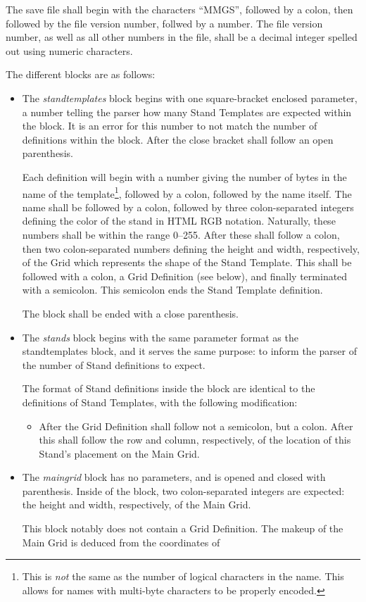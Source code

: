 \documentclass{report}
\begin{document}
The save file shall begin with the characters ``MMGS'', followed by a colon,
then followed by the file version number, follwed by a number. The
file version number, as well as all other numbers in the file, shall be a
decimal integer spelled out using numeric characters.

The different blocks are as follows:
\begin{itemize}
	\item The \emph{standtemplates} block begins with one square-bracket
		enclosed parameter, a number telling the parser how many
		Stand Templates are expected within the block. It is an error
		for this number to not match the number of definitions within
		the block. After the close bracket shall follow an open
		parenthesis.

		Each definition will begin with a number giving the number of
		bytes in the name of the template\footnote{This is \emph{not}
			the same as the number of logical characters in the
			name. This allows for names with multi-byte characters
		to be properly encoded.}, followed by a colon,
		followed by the name itself. The name shall be followed by
		a colon, followed by three colon-separated integers 
		defining the color of the stand in HTML RGB notation.
		Naturally, these numbers shall be within the range 0--255.
		After these shall follow a colon, then two colon-separated
		numbers defining the height and width, respectively, of
		the Grid which represents the shape of the Stand Template. This
		shall be followed with a colon, a Grid Definition (see below),
		and finally terminated with a semicolon. This semicolon ends
		the Stand Template definition.

		The block shall be ended with a close parenthesis.
	\item The \emph{stands} block begins with the same parameter format as
		the standtemplates block, and it serves the same purpose:
		to inform the parser of the number of Stand definitions to
		expect.

		The format of Stand definitions inside the block are
		identical to the definitions of Stand Templates, with the
		following modification:
		\begin{itemize}
			\item After the Grid Definition shall follow not a
				semicolon, but a colon. After this shall
				follow the row and column, respectively, of
				the location of this Stand's placement
				on the Main Grid.
		\end{itemize}
	\item The \emph{maingrid} block has no parameters, and is opened
		and closed with parenthesis. Inside of the
		block, two colon-separated integers are expected: the
		height and width, respectively, of the Main Grid.

		This block notably does not contain a Grid Definition. The
		makeup of the Main Grid is deduced from the coordinates of
\end{itemize}
\end{document}
